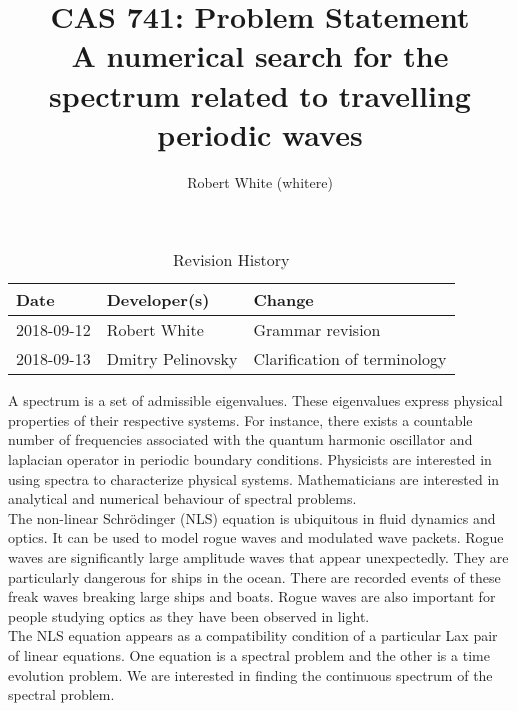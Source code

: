 \documentclass{article}
\title{CAS 741: Problem Statement\\A numerical search for the spectrum related to travelling periodic waves}
\author{Robert White (whitere)}
\date{}
\begin{document}
\maketitle
\begin{table}[hp]
\caption{Revision History} \label{TblRevisionHistory}
\begin{tabularx}{\textwidth}{llX}
\toprule
\textbf{Date} & \textbf{Developer(s)} & \textbf{Change}\\
\midrule
2018-09-12 & Robert White & Grammar revision \\
2018-09-13 & Dmitry Pelinovsky & Clarification of terminology\\
\bottomrule
\end{tabularx}
\end{table}


A spectrum is a set of admissible eigenvalues. These eigenvalues express
physical properties of their respective systems. For instance, there exists a
countable number of frequencies associated with the quantum harmonic oscillator
and laplacian  operator in periodic boundary conditions. Physicists are interested in using spectra to characterize physical systems. Mathematicians are interested in analytical and numerical behaviour of spectral problems.\\

The non-linear Schr\"{o}dinger (NLS)  equation is ubiquitous in fluid dynamics and optics. It can be used to model rogue waves and modulated wave packets. Rogue waves are significantly large amplitude waves that appear unexpectedly. They are particularly dangerous for ships in the ocean. There are recorded events of these freak waves breaking large ships and boats. Rogue waves are also important for people studying optics as they have been observed in light. \\

The NLS equation appears as a compatibility condition of a particular Lax pair of linear equations. One equation is a spectral problem and the other is a time evolution problem. We are interested in finding the continuous spectrum of the spectral problem. \\
\end{document}
